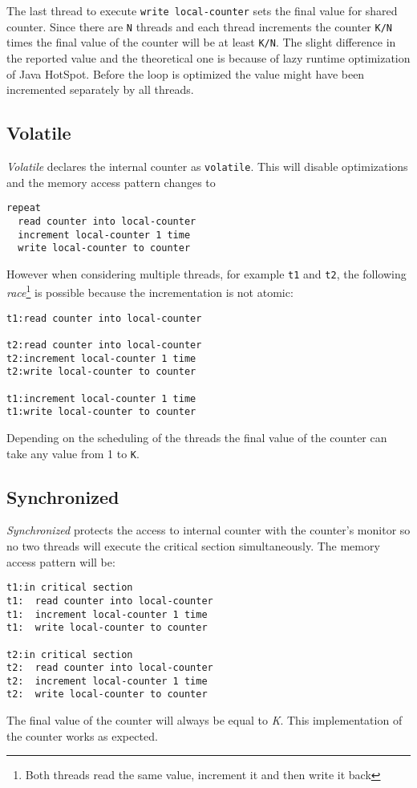 \documentclass[12pt]{article}
\begin{document}
The last thread to execute \texttt{write local-counter} sets the final
value for shared counter. Since there are \texttt{N} threads and each thread
increments the counter \texttt{K/N} times the final value of the counter
will be at least \texttt{K/N}. The slight difference in the reported value
and the theoretical one is because of lazy runtime optimization of Java HotSpot.
Before the loop is optimized the value might have been incremented separately
by all threads.

\subsection{Volatile}
\emph{Volatile} declares the internal counter as \texttt{volatile}.
This will disable optimizations and the memory access pattern changes to

\begin{verbatim}
repeat
  read counter into local-counter
  increment local-counter 1 time
  write local-counter to counter
\end{verbatim}

However when considering multiple threads, for example \texttt{t1} and
\texttt{t2}, the following \emph{race}\footnote{Both threads read the
same value, increment it and then write it back} is possible because
the incrementation is not atomic:

\begin{verbatim}
t1:read counter into local-counter

t2:read counter into local-counter
t2:increment local-counter 1 time
t2:write local-counter to counter

t1:increment local-counter 1 time
t1:write local-counter to counter
\end{verbatim}

Depending on the scheduling of the threads the final value of the counter can
take any value from 1 to \texttt{K}.

\subsection{Synchronized}

\emph{Synchronized} protects the access to internal counter with
the counter's monitor so no two threads will execute the critical
section simultaneously. The memory access pattern will be:

\begin{verbatim}
t1:in critical section
t1:  read counter into local-counter
t1:  increment local-counter 1 time
t1:  write local-counter to counter

t2:in critical section
t2:  read counter into local-counter
t2:  increment local-counter 1 time
t2:  write local-counter to counter
\end{verbatim}

The final value of the counter will always be equal to \emph{K}. This
implementation of the counter works as expected.
\end{document}
